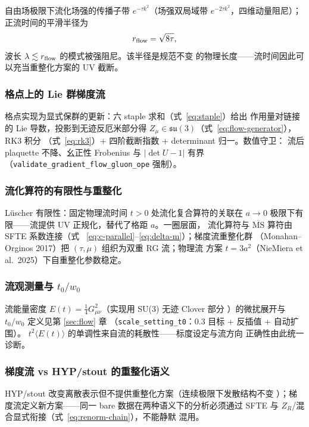 \documentclass[11pt,a4paper]{ctexart}
\newcommand{\MSbarM}{\overline{\text{MS}}}
\newcommand{\abs}[1]{\lvert #1\rvert}
\newcommand{\code}[1]{\texttt{#1}}
\begin{document}
自由场极限下流化场强的传播子带 $e^{-\tau k^2}$（场强双局域带
$e^{-2\tau k^2}$，四维动量阻尼）；正流时间的平滑半径为
\begin{equation}
r_{\rm flow}=\sqrt{8\tau},
\end{equation}
波长 $\lambda\lesssim r_{\rm flow}$ 的模式被强阻尼。该半径是规范不变
的物理长度——流时间因此可以充当重整化方案的 UV 截断。

\subsubsection{格点上的 Lie 群梯度流}

格点实现为显式保群的更新：六 staple 求和（式~\eqref{eq:staple}）给出
作用量对链接的 Lie 导数，投影到无迹反厄米部分得 $Z_\mu\in
\mathfrak{su}(3)$（式~\eqref{eq:flow-generator}），RK3 积分
（式~\eqref{eq:rk3}）+ 四阶截断指数 + determinant 归一。数值守卫：
流后 plaquette 不降、幺正性 Frobenius 与 $\abs{\det U-1}$ 有界
（\code{validate\_gradient\_flow\_gluon\_ope} 强制）。

\subsubsection{流化算符的有限性与重整化}

L\"uscher 有限性：固定物理流时间 $t>0$ 处流化复合算符的关联在
$a\to0$ 极限下有限——流提供 UV 正规化，替代了格距 $a$。一圈层面，
流化算符与 $\MSbarM$ 算符由 SFTE 系数连接（式
~\eqref{eq:c-parallel}--\eqref{eq:delta-m}）；梯度流重整化群
（Monahan--Orginos 2017）把 $(\tau,\mu)$ 组织为双重 RG 流；物理流
方案 $t=3a^2$（NieMiera et al.\ 2025）下自重整化参数稳定。

\subsubsection{流观测量与 $t_0/w_0$}

流能量密度 $E(t)=\frac14G^2_{\mu\nu}$（实现用 SU(3) 无迹 Clover 部分
）的微扰展开与 $t_0/w_0$ 定义见第 \ref{sec:flow} 章
（\code{scale\_setting\_t0}：0.3 目标 + 反插值 + 自动扩围）。
$t^2\langle E(t)\rangle$ 的单调性来自流的耗散性——标度设定与流方向
正确性由此统一诊断。

\subsubsection{梯度流 vs HYP/stout 的重整化语义}

HYP/stout 改变离散表示但不提供重整化方案（连续极限下发散结构不变
）；梯度流定义新方案——同一 bare 数据在两种语义下的分析必须通过
SFTE 与 $Z_R$/混合显式衔接（式~\eqref{eq:renorm-chain}），不能静默
混用。
\end{document}
